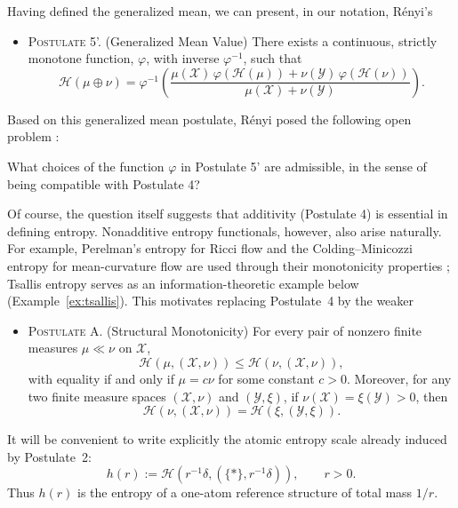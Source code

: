 \documentclass[reqno]{amsart}
\begin{document}
Having defined the generalized mean, we can present, in our notation, Rényi's
\begin{itemize}
    \item[] \textsc{Postulate 5'.} (Generalized Mean Value) \quad There exists a continuous, strictly monotone function, $\varphi$, with inverse $\varphi^{-1}$, such that 
    $$
    \mathcal{H}(\mu \oplus \nu) = \varphi^{-1} \left(\dfrac{\mu(\mathcal{X}) \,\varphi(\mathcal{H}(\mu)) + \nu(\mathcal{Y}) \,\varphi(\mathcal{H}(\nu))}{\mu(\mathcal{X})+ \nu(\mathcal{Y})} \right).
    $$
\end{itemize}

Based on this generalized mean postulate, Rényi posed the following open problem \cite{Ren61}:
\begin{ques}
\label{renyi-ques}
    \rm What choices of the function $\varphi$ in Postulate 5' are admissible, in the sense of being compatible with Postulate 4?
\end{ques}

Of course, the question itself suggests that additivity (Postulate 4) is essential in defining entropy. Nonadditive entropy functionals, however, also arise naturally. For example, Perelman's entropy for Ricci flow and the Colding--Minicozzi entropy for mean-curvature flow are used through their monotonicity properties \cite{Per02,ColMin12}; Tsallis entropy serves as an information-theoretic example below (Example~\ref{ex:tsallis}). This motivates replacing Postulate~4 by the weaker 
\begin{itemize}
    \item[] \textsc{Postulate A.} (Structural Monotonicity) \quad For every pair of nonzero finite measures $\mu \ll \nu$ on $\mathcal{X}$,
    $$
    \mathcal{H}(\mu, (\mathcal{X}, \nu)) \leq \mathcal{H}(\nu, (\mathcal{X}, \nu)),
    $$ 
    with equality if and only if $\mu = c \nu$ for some constant $c>0$. 
    Moreover, for any two finite measure spaces $(\mathcal{X}, \nu)$ and $(\mathcal{Y}, \xi)$, if $\nu(\mathcal{X}) = \xi(\mathcal{Y})>0$, then 
    $$\mathcal{H}(\nu, (\mathcal{X}, \nu)) = \mathcal{H}(\xi, (\mathcal{Y}, \xi)).
    $$
\end{itemize}

It will be convenient to write explicitly the atomic entropy scale already
induced by Postulate~2:
\begin{equation}
\label{eq:atomic-h}
h(r)
:=
\mathcal H
\left(
r^{-1}\delta,
(\{\ast\},r^{-1}\delta)
\right),
\qquad r>0.
\end{equation}
Thus $h(r)$ is the entropy of a one-atom reference structure of total
mass $1/r$.
\end{document}
